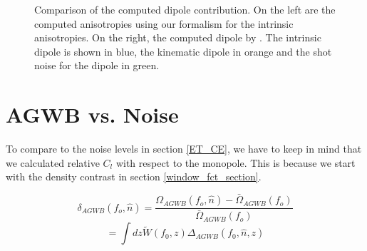 \begin{figure}
    \centering
    \caption[Comparison of the computed dipole contribution to \cite{dallarmi_dipole_2022}.]{Comparison of the computed dipole contribution. On the left are the computed anisotropies using our formalism for the intrinsic anisotropies. On the right, the computed dipole by \cite{dallarmi_dipole_2022}. The intrinsic dipole is shown in blue, the kinematic dipole in orange and the shot noise for the dipole in green.}
    \label{lorenzo_comparison}
\end{figure} 


\section{AGWB vs. Noise}

To compare to the noise levels in section \ref{ET_CE}, we have to keep in mind that we calculated relative $C_l$ with respect to the monopole. This is because we start with the density contrast in section \ref{window_fct_section}.

\begin{equation}
    \delta_{AGWB}(f_o, \hat{n})=\frac{\Omega_{AGWB}(f_o, \hat{n})-\bar{\Omega}_{AGWB}(f_o)}{\bar{\Omega}_{AGWB}(f_o)}
\end{equation}
\begin{equation}
    =\int dz \tilde{W}(f_0, z)\Delta_{AGWB}(f_0, \hat{n}, z)
\end{equation}

